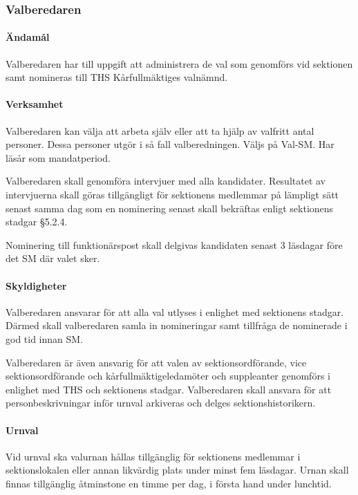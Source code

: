 \documentclass[a4paper,12pt]{article}
\begin{document}
\subsubsection{Valberedaren}

\paragraph{Ändamål}

Valberedaren har till uppgift att administrera de val som genomförs vid sektionen samt nomineras till THS Kårfullmäktiges valnämnd.

\paragraph{Verksamhet}

Valberedaren kan välja att arbeta själv eller att ta hjälp av valfritt antal personer. Dessa personer utgör i så fall valberedningen. Väljs på Val-SM. Har läsår som mandatperiod.

Valberedaren skall genomföra intervjuer med alla kandidater.
Resultatet av intervjuerna skall göras tillgängligt för sektionens medlemmar på lämpligt sätt
senast samma dag som en nominering senast skall bekräftas enligt sektionens stadgar \S5.2.4.

Nominering till funktionärspost skall delgivas kandidaten senast 3 läsdagar före det SM där valet sker.

\paragraph{Skyldigheter}

Valberedaren ansvarar för att alla val utlyses i enlighet med sektionens stadgar. Därmed skall valberedaren samla in nomineringar samt tillfråga de nominerade i god tid innan SM.

Valberedaren är även ansvarig för att valen av sektionsordförande, vice sektionsordförande och kårfullmäktigeledamöter och suppleanter genomförs i enlighet med THS och sektionens stadgar. Valberedaren skall ansvara för att personbeskrivningar inför urnval arkiveras och delges sektionshistorikern.

\paragraph{Urnval}

Vid urnval ska valurnan hållas tillgänglig för sektionens medlemmar i sektionslokalen eller annan likvärdig plats under minst fem läsdagar. Urnan skall finnas tillgänglig åtminstone en timme per dag, i första hand under lunchtid.
\end{document}
